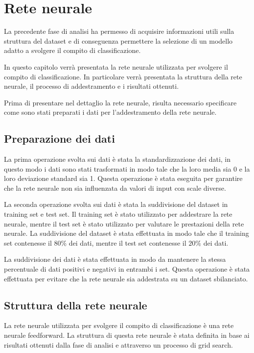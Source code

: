 \chapter{Rete neurale} \label{chp:reteNeurale}
La precedente fase di analisi ha permesso di acquisire informazioni utili sulla
struttura del dataset e di conseguenza permettere la selezione di un modello
adatto a svolgere il compito di classificazione.

In questo capitolo verrà presentata la rete neurale utilizzata per svolgere il
compito di classificazione. In particolare verrà presentata la struttura della
rete neurale, il processo di addestramento e i risultati ottenuti.

Prima di presentare nel dettaglio la rete neurale, risulta necessario specificare 
come sono stati preparati i dati per l'addestramento della rete neurale.
\section{Preparazione dei dati}
La prima operazione svolta sui dati è stata la standardizzazione dei dati, in 
questo modo i dati sono stati trasformati in modo tale che la loro media sia 0
e la loro deviazione standard sia 1. Questa operazione è stata eseguita per
garantire che la rete neurale non sia influenzata da valori di input con scale
diverse.

La seconda operazione svolta sui dati è stata la suddivisione del dataset in
training set e test set. Il training set è stato utilizzato per addestrare la
rete neurale, mentre il test set è stato utilizzato per valutare le prestazioni
della rete neurale. La suddivisione del dataset è stata effettuata in modo tale
che il training set contenesse il $80\%$ dei dati, mentre il test set contenesse
il $20\%$ dei dati.

La suddivisione dei dati è stata effettuata in modo da mantenere la stessa 
percentuale di dati positivi e negativi in entrambi i set. Questa operazione è
stata effettuata per evitare che la rete neurale sia addestrata su un dataset
sbilanciato.
\section{Struttura della rete neurale}
La rete neurale utilizzata per svolgere il compito di classificazione è una rete
neurale feedforward. La struttura di questa rete neurale è stata definita in
base ai risultati ottenuti dalla fase di analisi e attraverso un processo di grid
search.

